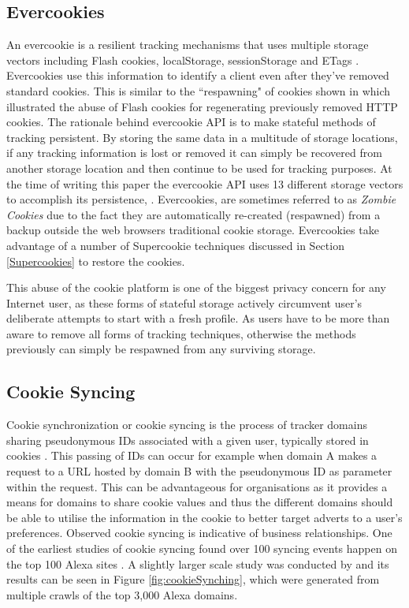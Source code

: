 \documentclass[12pt]{article}
\begin{document}
\subsection{Evercookies}
An evercookie is a resilient tracking mechanisms that uses multiple storage vectors including Flash cookies, localStorage, sessionStorage and ETags \parencite{evercookies}. Evercookies use this information to identify a client even after they've removed standard cookies. This is similar to the ``respawning" of cookies shown in \parencite{flashCookiesPrivacy} which illustrated the abuse of Flash cookies for regenerating previously removed HTTP cookies. The rationale behind evercookie API is to make stateful methods of tracking persistent. By storing the same data in a multitude of storage locations, if any tracking information is lost or removed it can simply be recovered from another storage location and then continue to be used for tracking purposes. At the time of writing this paper the evercookie API uses 13 different storage vectors to accomplish its persistence,  \parencite{evercookies}. Evercookies, are sometimes referred to as \textit{Zombie Cookies} due to the fact they are automatically re-created (respawned) from a backup outside the web browsers traditional cookie storage. Evercookies take advantage of a number of Supercookie techniques discussed in Section \ref{Supercookies} to restore the cookies. \newline

This abuse of the cookie platform is one of the biggest privacy concern for any Internet user, as these forms of stateful storage actively circumvent user's deliberate attempts to start with a fresh profile. As users have to be more than aware to remove all forms of tracking techniques, otherwise the methods previously can simply be respawned from any surviving storage. 

\subsection{Cookie Syncing}
Cookie synchronization or cookie syncing is the process of tracker domains sharing pseudonymous IDs associated with a given user, typically stored in cookies \parencite{webNeverForgets}. This passing of IDs can occur for example when domain A makes a request to a URL hosted by domain B with the pseudonymous ID as parameter within the request. This can be advantageous for organisations as it provides a means for domains to share cookie values and thus the different domains should be able to utilise the information in the cookie to better target adverts to a user's preferences. Observed cookie syncing is indicative of business relationships.  One of the earliest studies of cookie syncing found over 100 syncing events happen on the top 100 Alexa sites \parencite{sellingPrivacy}. A slightly larger scale study was conducted by \parencite{webNeverForgets} and its results can be seen in Figure \ref{fig:cookieSynching}, which were generated from multiple crawls of the top 3,000 Alexa domains. 
\end{document}
